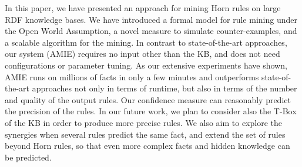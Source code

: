 
In this paper, we have presented an approach for mining Horn rules on large RDF knowledge bases. We have introduced a formal model for rule mining under the Open World Assumption, a novel measure to simulate counter-examples, and a scalable algorithm for the mining. 
In contrast to state-of-the-art approaches, our system (AMIE) requires no input other than the KB, and does not need configurations or parameter tuning.
As our extensive experiments have shown, AMIE runs on millions of facts in only a few minutes and outperforms state-of-the-art approaches not only in terms of runtime, but also in terms of the number and quality of the output rules. Our confidence measure can reasonably predict the precision of the rules.
In our future work, we plan to consider also the T-Box of the KB in order to produce more precise rules. We also aim to explore the synergies when several rules predict the same fact, and extend the set of rules beyond Horn rules, so that even more complex facts and hidden knowledge can be predicted.\\[-0.5cm]